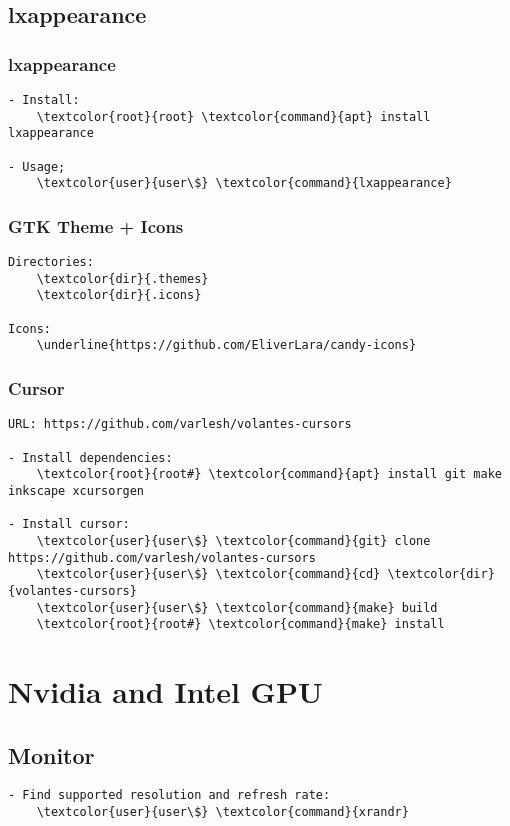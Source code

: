 \documentclass[10pt, a4paper, onecolumn, openany]{book} %
\begin{document}
\section{lxappearance}
\subsection{lxappearance}
\begin{Verbatim}[commandchars=\\\{\}]
- Install:
    \textcolor{root}{root} \textcolor{command}{apt} install lxappearance
    
- Usage;
    \textcolor{user}{user\$} \textcolor{command}{lxappearance}
\end{Verbatim}
\subsection{GTK Theme + Icons}
\begin{Verbatim}[commandchars=\\\{\}]
Directories:
    \textcolor{dir}{.themes}
    \textcolor{dir}{.icons}
    
Icons:
    \underline{https://github.com/EliverLara/candy-icons}
\end{Verbatim}
\subsection{Cursor}
\begin{Verbatim}[commandchars=\\\{\}]
URL: https://github.com/varlesh/volantes-cursors 

- Install dependencies:
    \textcolor{root}{root#} \textcolor{command}{apt} install git make inkscape xcursorgen

- Install cursor:
    \textcolor{user}{user\$} \textcolor{command}{git} clone https://github.com/varlesh/volantes-cursors
    \textcolor{user}{user\$} \textcolor{command}{cd} \textcolor{dir}{volantes-cursors}
    \textcolor{user}{user\$} \textcolor{command}{make} build
    \textcolor{root}{root#} \textcolor{command}{make} install
\end{Verbatim}



\chapter{Nvidia and Intel GPU}
\section{Monitor}
\begin{Verbatim}[commandchars=\\\{\}]
- Find supported resolution and refresh rate:
    \textcolor{user}{user\$} \textcolor{command}{xrandr}
\end{Verbatim}
\end{document}
